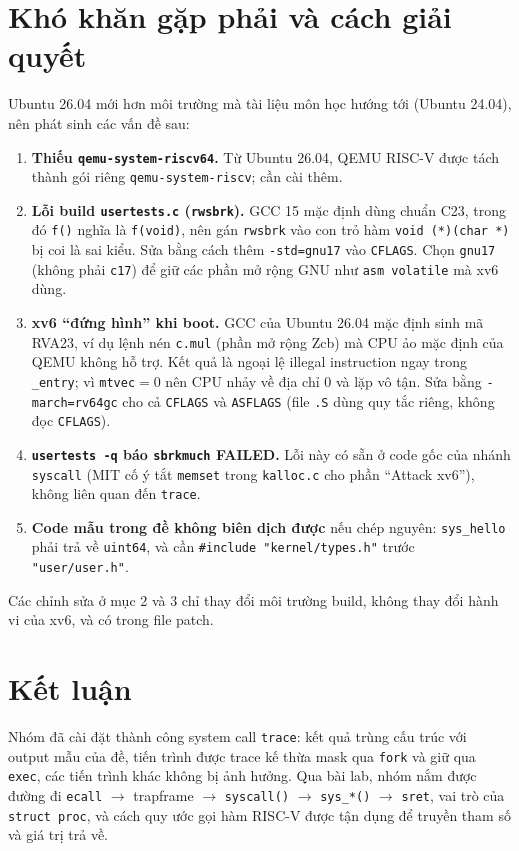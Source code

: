 \documentclass[12pt,a4paper]{article}
\newcommand{\code}[1]{\texttt{#1}}
\begin{document}
\section{Khó khăn gặp phải và cách giải quyết}\label{sec:env}
Ubuntu 26.04 mới hơn môi trường mà tài liệu môn học hướng tới (Ubuntu 24.04), nên phát sinh các vấn đề sau:
\begin{enumerate}
  \item \textbf{Thiếu \code{qemu-system-riscv64}.} Từ Ubuntu 26.04, QEMU RISC-V được tách thành gói riêng \code{qemu-system-riscv}; cần cài thêm.
  \item \textbf{Lỗi build \code{usertests.c} (\code{rwsbrk}).} GCC 15 mặc định dùng chuẩn C23, trong đó \code{f()} nghĩa là \code{f(void)}, nên gán \code{rwsbrk} vào con trỏ hàm \code{void (*)(char *)} bị coi là sai kiểu. Sửa bằng cách thêm \code{-std=gnu17} vào \code{CFLAGS}. Chọn \code{gnu17} (không phải \code{c17}) để giữ các phần mở rộng GNU như \code{asm volatile} mà xv6 dùng.
  \item \textbf{xv6 ``đứng hình'' khi boot.} GCC của Ubuntu 26.04 mặc định sinh mã RVA23, ví dụ lệnh nén \code{c.mul} (phần mở rộng Zcb) mà CPU ảo mặc định của QEMU không hỗ trợ. Kết quả là ngoại lệ illegal instruction ngay trong \code{\_entry}; vì \code{mtvec}$=0$ nên CPU nhảy về địa chỉ 0 và lặp vô tận. Sửa bằng \code{-march=rv64gc} cho cả \code{CFLAGS} và \code{ASFLAGS} (file \code{.S} dùng quy tắc riêng, không đọc \code{CFLAGS}).
  \item \textbf{\code{usertests -q} báo \code{sbrkmuch} FAILED.} Lỗi này có sẵn ở code gốc của nhánh \code{syscall} (MIT cố ý tắt \code{memset} trong \code{kalloc.c} cho phần ``Attack xv6''), không liên quan đến \code{trace}.
  \item \textbf{Code mẫu trong đề không biên dịch được} nếu chép nguyên: \code{sys\_hello} phải trả về \code{uint64}, và cần \code{\#include "kernel/types.h"} trước \code{"user/user.h"}.
\end{enumerate}
Các chỉnh sửa ở mục 2 và 3 chỉ thay đổi môi trường build, không thay đổi hành vi của xv6, và có trong file patch.

\section{Kết luận}
Nhóm đã cài đặt thành công system call \code{trace}: kết quả trùng cấu trúc với output mẫu của đề, tiến trình được trace kế thừa mask qua \code{fork} và giữ qua \code{exec}, các tiến trình khác không bị ảnh hưởng. Qua bài lab, nhóm nắm được đường đi \code{ecall} $\rightarrow$ trapframe $\rightarrow$ \code{syscall()} $\rightarrow$ \code{sys\_*()} $\rightarrow$ \code{sret}, vai trò của \code{struct proc}, và cách quy ước gọi hàm RISC-V được tận dụng để truyền tham số và giá trị trả về.
\end{document}
